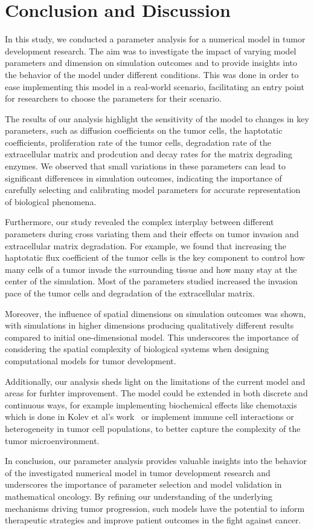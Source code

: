 \section{Conclusion and Discussion}
In this study, we conducted a parameter analysis for a numerical model in tumor development research. The aim was to investigate the impact of varying model parameters and dimension on simulation outcomes and to provide insights into the behavior of the model under different conditions. This was done in order to ease implementing this model in a real-world scenario, facilitating an entry point for researchers to choose the parameters for their scenario.

The results of our analysis highlight the sensitivity of the model to changes in key parameters, such as diffusion coefficients on the tumor cells, the haptotatic coefficients, proliferation rate of the tumor cells, degradation rate of the extracellular matrix and prodcution and decay rates for the matrix degrading enzymes. We observed that small variations in these parameters can lead to significant differences in simulation outcomes, indicating the importance of carefully selecting and calibrating model parameters for accurate representation of biological phenomena.

Furthermore, our study revealed the complex interplay between different parameters during cross variating them and their effects on tumor invasion and extracellular matrix degradation. For example, we found that increasing the haptotatic flux coefficient of the tumor cells is the key component to control how many cells of a tumor invade the surrounding tissue and how many stay at the center of the simulation. Most of the parameters studied increased the invasion pace of the tumor cells and degradation of the extracellular matrix.

Moreover, the influence of spatial dimensions on simulation outcomes was shown, with simulations in higher dimensions producing qualitatively different results compared to initial one-dimensional model. This underscores the importance of considering the spatial complexity of biological systems when designing computational models for tumor development.

Additionally, our analysis sheds light on the limitations of the current model and areas for furhter improvement. The model could be extended in both discrete and continuous ways, for example implementing biochemical effects like chemotaxis which is done in Kolev et al's work~\cite{Kolev2010} or implement immune cell interactions or heterogeneity in tumor cell populations, to better capture the complexity of the tumor microenvironment.

In conclusion, our parameter analysis provides valuable insights into the behavior of the investigated numerical model in tumor development research and underscores the importance of parameter selection and model validation in mathematical oncology. By refining our understanding of the underlying mechanisms driving tumor progression, such models have the potential to inform therapeutic strategies and improve patient outcomes in the fight against cancer.